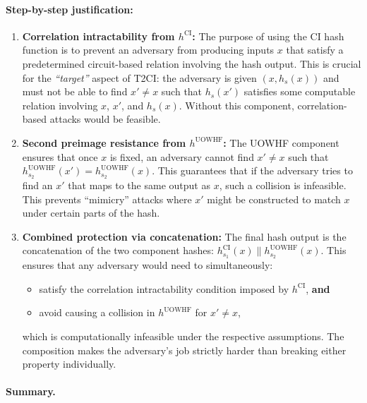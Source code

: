 \documentclass[12pt]{article}%
\begin{document}
\paragraph{Step-by-step justification:}

\begin{enumerate}
    \item \textbf{Correlation intractability from $h^{\mathrm{CI}}$:} The purpose of using the CI hash function is to prevent an adversary from producing inputs $x$ that satisfy a predetermined circuit-based relation involving the hash output. This is crucial for the \textit{“target”} aspect of T2CI: the adversary is given $(x, h_s(x))$ and must not be able to find $x' \ne x$ such that $h_s(x')$ satisfies some computable relation involving $x$, $x'$, and $h_s(x)$. Without this component, correlation-based attacks would be feasible.

    \item \textbf{Second preimage resistance from $h^{\mathrm{UOWHF}}$:} The UOWHF component ensures that once $x$ is fixed, an adversary cannot find $x' \ne x$ such that $h^{\mathrm{UOWHF}}_{s_2}(x') = h^{\mathrm{UOWHF}}_{s_2}(x)$. This guarantees that if the adversary tries to find an $x'$ that maps to the same output as $x$, such a collision is infeasible. This prevents “mimicry” attacks where $x'$ might be constructed to match $x$ under certain parts of the hash.

    \item \textbf{Combined protection via concatenation:} The final hash output is the concatenation of the two component hashes: $h^{\mathrm{CI}}_{s_1}(x) \| h^{\mathrm{UOWHF}}_{s_2}(x)$. This ensures that any adversary would need to simultaneously:
    \begin{itemize}
        \item satisfy the correlation intractability condition imposed by $h^{\mathrm{CI}}$, \textbf{and}
        \item avoid causing a collision in $h^{\mathrm{UOWHF}}$ for $x' \ne x$,
    \end{itemize}
    which is computationally infeasible under the respective assumptions. The composition makes the adversary’s job strictly harder than breaking either property individually.
\end{enumerate}

\paragraph{Summary.}
\end{document}
